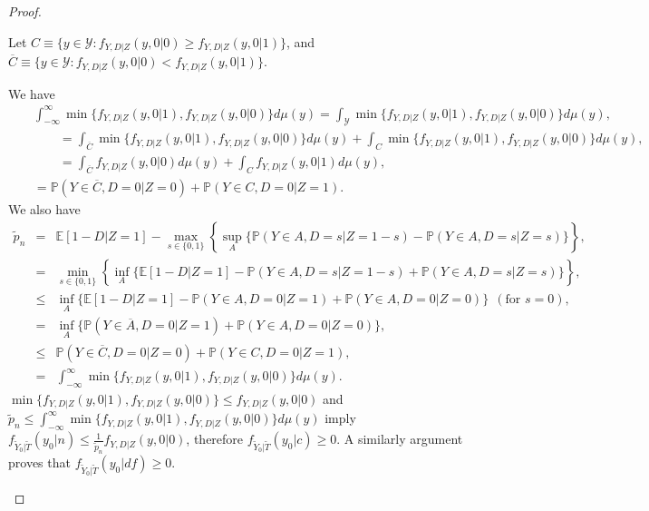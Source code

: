 \documentclass[12pt]{article}
\theoremstyle{plain}
\theoremstyle{definition}
\theoremstyle{remark}
\begin{document}
\begin{proof}
\begin{enumerate}
Let $C\equiv \{y\in \mathcal Y: f_{Y,D\vert Z}(y,0\vert 0) \geq f_{Y,D\vert Z}(y,0\vert 1)\}$, and $\overline{C}\equiv \{y\in \mathcal Y: f_{Y,D\vert Z}(y,0\vert 0) < f_{Y,D\vert Z}(y,0\vert 1)\}$.

We have
\begin{eqnarray*}
&& \int^{\infty}_{-\infty}\min\{f_{Y,D\vert Z}(y,0\vert 1),f_{Y,D\vert Z}(y,0\vert 0)\}d\mu(y)=\int_{\mathcal Y}\min\{f_{Y,D\vert Z}(y,0\vert 1),f_{Y,D\vert Z}(y,0\vert 0)\}d\mu(y),\\
&& \qquad = \int_{\overline{C}}\min\{f_{Y,D\vert Z}(y,0\vert 1),f_{Y,D\vert Z}(y,0\vert 0)\}d\mu(y) + \int_{C}\min\{f_{Y,D\vert Z}(y,0\vert 1),f_{Y,D\vert Z}(y,0\vert 0)\}d\mu(y),\\
&& \qquad = \int_{\overline{C}}f_{Y,D\vert Z}(y,0\vert 0)d\mu(y) + \int_{C}f_{Y,D\vert Z}(y,0\vert 1)d\mu(y),\\
&& =\mathbb{P}(Y \in \overline{C}, D=0 \vert Z=0)+\mathbb{P}(Y \in C, D=0 \vert Z=1).
\end{eqnarray*}
We also have 
\begin{eqnarray*}
    \tilde{p}_n &=& \mathbb E[1-D \vert Z=1]-\max_{s \in\{0,1\}}\left\{\sup _A\{\mathbb{P}(Y \in A, D=s  \vert  Z=1-s)-\mathbb{P}(Y \in A, D=s  \vert  Z=s)\}\right\},\\
    &=& \min_{s \in\{0,1\}}\left\{\inf_A\{\mathbb E[1-D \vert Z=1]-\mathbb{P}(Y \in A, D=s  \vert  Z=1-s)+\mathbb{P}(Y \in A, D=s  \vert  Z=s)\}\right\},\\
    &\leq& \inf_A\{\mathbb E[1-D \vert Z=1]-\mathbb{P}(Y \in A, D=0  \vert  Z=1)+\mathbb{P}(Y \in A, D=0  \vert  Z=0)\} \ \ (\text{for } s=0),\\
    &=& \inf_A\{\mathbb{P}(Y \in \overline{A}, D=0  \vert  Z=1)+\mathbb{P}(Y \in A, D=0  \vert  Z=0)\}, \\
    &\leq& \mathbb{P}(Y \in \overline{C}, D=0  \vert  Z=0)+\mathbb{P}(Y \in C, D=0 \vert Z=1),\\
    &=&  \int^{\infty}_{-\infty}\min\{f_{Y,D\vert Z}(y,0\vert 1),f_{Y,D\vert Z}(y,0\vert 0)\}d\mu(y).    
\end{eqnarray*}
$\min\{f_{Y,D\vert Z}(y,0\vert 1),f_{Y,D\vert Z}(y,0\vert 0)\} \leq f_{Y,D\vert Z}(y,0\vert 0)$ and $\tilde{p}_n \leq \int^{\infty}_{-\infty}\min\{f_{Y,D\vert Z}(y,0\vert 1),f_{Y,D\vert Z}(y,0\vert 0)\}d\mu(y)$ imply $f_{\tilde{Y}_0 \vert \tilde{T}}(y_0 \vert n) \leq \frac{1}{\tilde{p}_n} f_{Y,D\vert Z}(y,0\vert 0)$, therefore $f_{\tilde{Y}_0 \vert \tilde{T}}(y_0 \vert c) \geq 0$. A similarly argument proves that $f_{\tilde{Y}_0 \vert \tilde{T}}(y_0 \vert df) \geq 0$. 


\end{enumerate}
\end{proof}
\end{document}
